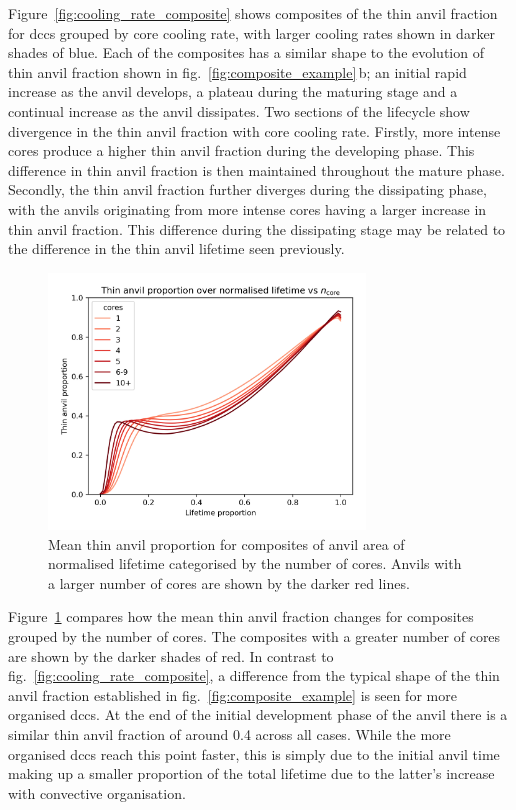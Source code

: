 Figure~\ref{fig:cooling_rate_composite} shows composites of the thin anvil fraction for \acrshort{dcc}s grouped by core cooling rate, with larger cooling rates shown in darker shades of blue.
Each of the composites has a similar shape to the evolution of thin anvil fraction shown in fig.~\ref{fig:composite_example}\,b; an initial rapid increase as the anvil develops, a plateau during the maturing stage and a continual increase as the anvil dissipates.
Two sections of the lifecycle show divergence in the thin anvil fraction with core cooling rate.
Firstly, more intense cores produce a higher thin anvil fraction during the developing phase.
This difference in thin anvil fraction is then maintained throughout the mature phase.
Secondly, the thin anvil fraction further diverges during the dissipating phase, with the anvils originating from more intense cores having a larger increase in thin anvil fraction.
This difference during the dissipating stage may be related to the difference in the thin anvil lifetime seen previously.


\begin{figure}[tp]
    \centering
    \includegraphics[width=0.75\textwidth]{figures/chapter3_14.png}
    \caption[
    Mean thin anvil proportion for composites of anvil area of normalised lifetime categorised by the number of cores
    ]{
    Mean thin anvil proportion for composites of anvil area of normalised lifetime categorised by the number of cores. Anvils with a larger number of cores are shown by the darker red lines.
    }
    \label{fig:number_of_cores_composite}
\end{figure}

Figure~\ref{fig:number_of_cores_composite} compares how the mean thin anvil fraction changes for composites grouped by the number of cores.
The composites with a greater number of cores are shown by the darker shades of red.
In contrast to fig.~\ref{fig:cooling_rate_composite}, a difference from the typical shape of the thin anvil fraction established in fig.~\ref{fig:composite_example} is seen for more organised \acrshort{dcc}s.
At the end of the initial development phase of the anvil there is a similar thin anvil fraction of around 0.4 across all cases.
While the more organised \acrshort{dcc}s reach this point faster, this is simply due to the initial anvil time making up a smaller proportion of the total lifetime due to the latter's increase with convective organisation.


